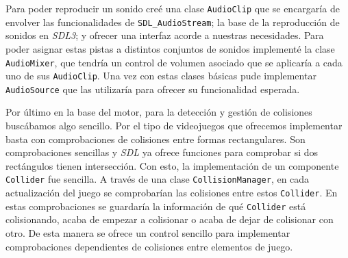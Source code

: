 \smallskip

Para poder reproducir un sonido creé una clase \texttt{AudioClip} que se encargaría de envolver las funcionalidades de \texttt{SDL\_AudioStream}; la base de la reproducción de sonidos en \textit{SDL3}; y ofrecer una interfaz acorde a nuestras necesidades. Para poder asignar estas pistas a distintos conjuntos de sonidos implementé la clase \texttt{AudioMixer}, que tendría un control de volumen asociado que se aplicaría a cada uno de sus \texttt{AudioClip}. Una vez con estas clases básicas pude implementar \texttt{AudioSource} que las utilizaría para ofrecer su funcionalidad esperada.

\medskip

Por último en la base del motor, para la detección y gestión de colisiones buscábamos algo sencillo. Por el tipo de videojuegos que ofrecemos implementar basta con comprobaciones de colisiones entre formas rectangulares. Son comprobaciones sencillas y \textit{SDL} ya ofrece funciones para comprobar si dos rectángulos tienen intersección. Con esto, la implementación de un componente \texttt{Collider} fue sencilla. A través de una clase \texttt{CollisionManager}, en cada actualización del juego se comprobarían las colisiones entre estos \texttt{Collider}. En estas comprobaciones se guardaría la información de qué \texttt{Collider} está colisionando, acaba de empezar a colisionar o acaba de dejar de colisionar con otro. De esta manera se ofrece un control sencillo para implementar comprobaciones dependientes de colisiones entre elementos de juego.

\medskip

